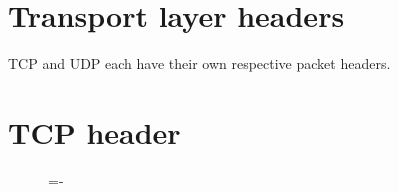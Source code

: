 \documentclass[a4paper]{systems-software}
\begin{document}
\section{Transport layer headers}

TCP and UDP each have their own respective packet headers.


\section*{TCP header}

\begin{figure}[H]
	\lineskip=-\fboxrule
\end{figure}
\end{document}
